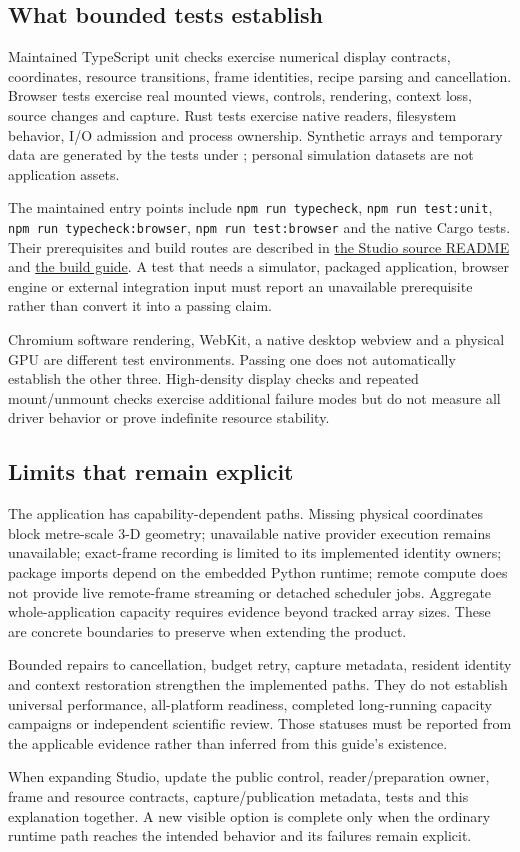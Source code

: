 \subsection{What bounded tests establish}
Maintained TypeScript unit checks exercise numerical display contracts,
coordinates, resource transitions, frame identities, recipe parsing and
cancellation. Browser tests exercise real mounted views, controls, rendering,
context loss, source changes and capture. Rust tests exercise native readers,
filesystem behavior, I/O admission and process ownership. Synthetic arrays and
temporary data are generated by the tests under ; personal
simulation datasets are not application assets.

The maintained entry points include \texttt{npm run typecheck},
\texttt{npm run test:unit}, \texttt{npm run typecheck:browser},
\texttt{npm run test:browser} and the native Cargo tests. Their prerequisites
and build routes are described in \href{../ui/README.md}{the Studio source
README} and \href{BUILDING.md}{the build guide}. A test that needs a simulator,
packaged application, browser engine or external integration input must report
an unavailable prerequisite rather than convert it into a passing claim.

Chromium software rendering, WebKit, a native desktop webview and a physical GPU
are different test environments. Passing one does not automatically establish
the other three. High-density display checks and repeated mount/unmount checks
exercise additional failure modes but do not measure all driver behavior or
prove indefinite resource stability.

\subsection{Limits that remain explicit}
The application has capability-dependent paths. Missing physical coordinates
block metre-scale 3-D geometry; unavailable native provider execution remains
unavailable; exact-frame recording is limited to its implemented identity
owners; package imports depend on the embedded Python runtime; remote compute
does not provide live remote-frame streaming or detached scheduler jobs.
Aggregate whole-application capacity requires evidence beyond tracked array
sizes. These are concrete boundaries to preserve when extending the product.

Bounded repairs to cancellation, budget retry, capture metadata, resident
identity and context restoration strengthen the implemented paths. They do not
establish universal performance, all-platform readiness, completed long-running
capacity campaigns or independent scientific review. Those statuses must be
reported from the applicable evidence rather than inferred from this guide's
existence.

When expanding Studio, update the public control, reader/preparation owner,
frame and resource contracts, capture/publication metadata, tests and this
explanation together. A new visible option is complete only when the ordinary
runtime path reaches the intended behavior and its failures remain explicit.
